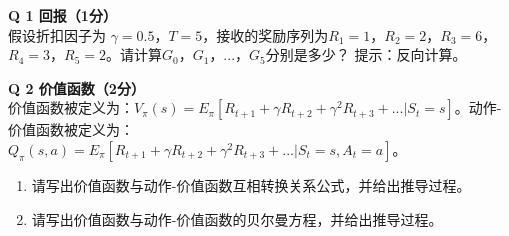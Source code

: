 \documentclass[a4paper, 11pt]{article}
\newenvironment{problem}[2][Q]
    { \begin{mdframed}[backgroundcolor=gray!20] \textbf{#1 #2} \\}
    {  \end{mdframed}}
\begin{document}
\begin{CJK}{UTF8}{gbsn}
\begin{problem}{1 回报（1分）}
假设折扣因子为 $\gamma=0.5$，$T=5$，接收的奖励序列为$R_1=1$，$R_2=2$，$R_3=6$，$R_4=3$，$R_5=2$。请计算$G_0$，$G_1$，...，$G_5$分别是多少？ 提示：反向计算。
\end{problem}






\begin{problem}{2 价值函数（2分）}
价值函数被定义为：$V_{\pi} (s)=E_{\pi} [R_{t+1}+\gamma R_{t+2}+\gamma^2 R_{t+3}+...|S_t=s]$。动作-价值函数被定义为：$Q_{\pi} (s,a)=E_{\pi} [R_{t+1}+\gamma R_{t+2}+\gamma^2 R_{t+3}+...|S_t=s, A_t=a]$。
\begin{enumerate}
\item 请写出价值函数与动作-价值函数互相转换关系公式，并给出推导过程。
\item 请写出价值函数与动作-价值函数的贝尔曼方程，并给出推导过程。
\end{enumerate}
\end{problem}






\end{CJK}
\end{document}

